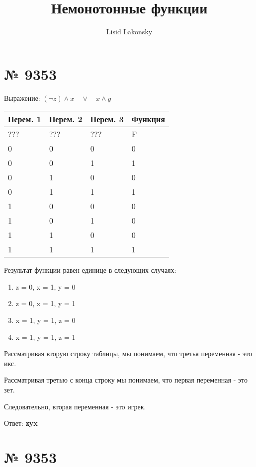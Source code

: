 \documentclass[11pt]{article} %
\title{Немонотонные функции}
\author{Lisid Lakonsky}
\begin{document}
\maketitle

\section{№ \textbf{9353}}

Выражение: $(\lnot{z})\land x \quad \lor \quad x \land y$

\vspace{2mm}
\begin{tabular}{ | l | l | l | l | }
\hline
Перем. 1 & Перем. 2 & Перем. 3 & Функция \\ \hline
??? & ??? & ??? & F \\ \hline
0 & 0 & 0 & 0 \\ \hline
0 & 0 & 1 & 1 \\ \hline
0 & 1 & 0 & 0 \\ \hline
0 & 1 & 1 & 1 \\ \hline
1 & 0 & 0 & 0 \\ \hline
1 & 0 & 1 & 0 \\ \hline
1 & 1 & 0 & 0 \\ \hline
1 & 1 & 1 & 1 \\ \hline
\end{tabular}

\vspace{2mm}

Результат функции равен единице в следующих случаях:

\begin{enumerate}
	\item z = 0, x = 1, y = 0
	\item z = 0, x = 1, y = 1
	\item x = 1, y = 1, z = 0
	\item x = 1, y = 1, z = 1
\end{enumerate}

Рассматривая вторую строку таблицы, мы понимаем, что третья переменная - это икс.

Рассматривая третью с конца строку мы понимаем, что первая переменная - это зет.

Следовательно, вторая переменная - это игрек.

Ответ: \textbf{zyx}

\section{№ \textbf{9353}}
\end{document}
